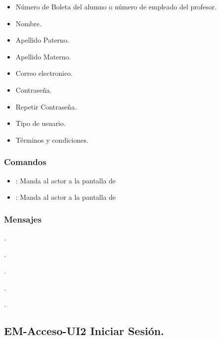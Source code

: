 	\begin{itemize}
		\item Número de Boleta del alumno o número de empleado del profesor.
	    \item Nombre. 	
	    \item Apellido Paterno.
	    \item Apellido Materno.
		\item Correo electronico.
		\item Contraseña.
		\item Repetir Contraseña.
		\item Tipo de usuario.
		\item Términos y condiciones. 
	\end{itemize}

\subsubsection{Comandos}
	
	\begin{itemize}
		\item {}: Manda al actor a la pantalla de 
		\item {}: Manda al actor a la pantalla de 
	\end{itemize}

\subsubsection{Mensajes}
	
	\begin{Citemize}
		\item {}.
		\item {}.	
	    \item {}.
	    \item {}.
	    \item {}.
	\end{Citemize}



\subsection{EM-Acceso-UI2 Iniciar Sesión.}

